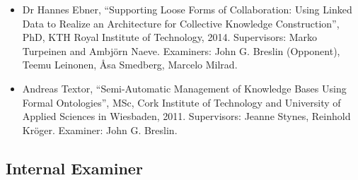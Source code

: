 \documentclass[10pt,a4paper]{res} %
\begin{document}
\begin{resume}
\begin{itemize}
\item Dr Hannes Ebner, ``Supporting Loose Forms of Collaboration: Using Linked Data to Realize an Architecture for Collective Knowledge Construction'', PhD, KTH Royal Institute of Technology, 2014. Supervisors: Marko Turpeinen and Ambj{\"o}rn Naeve. Examiners: John G. Breslin (Opponent), Teemu Leinonen, \r{A}sa Smedberg, Marcelo Milrad.
\item Andreas Textor, ``Semi-Automatic Management of Knowledge Bases Using Formal Ontologies'', MSc, Cork Institute of Technology and University of Applied Sciences in Wiesbaden, 2011. Supervisors: Jeanne Stynes, Reinhold Kr{\"o}ger. Examiner: John G. Breslin.
\end{itemize}

\subsection*{Internal Examiner}


\end{resume}
\end{document}
